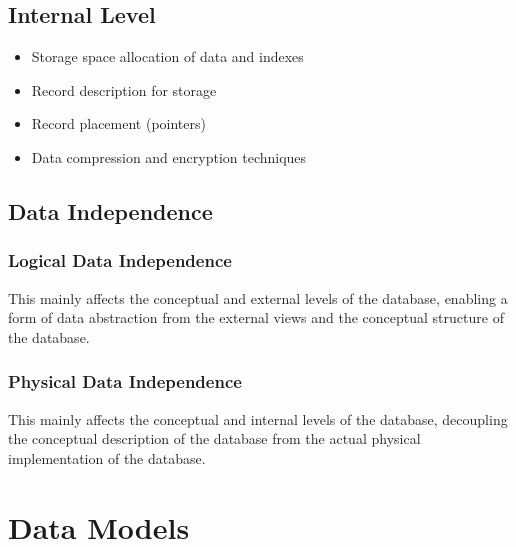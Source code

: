 \documentclass[12pt letter]{report}
\begin{document}
\subsection{Internal Level}


\begin{itemize}
  \item Storage space allocation of data and indexes
  \item Record description for storage
  \item Record placement (pointers)
  \item Data compression and encryption techniques
\end{itemize}

\subsection{Data Independence}
\subsubsection{Logical Data Independence}

This mainly affects the conceptual and external levels of the database, enabling a form of data abstraction from the
external views and the conceptual structure of the database.

\subsubsection{Physical Data Independence}

This mainly affects the conceptual and internal levels of the database, decoupling the conceptual description of the
database from the actual physical implementation of the database.

\section{Data Models}
\end{document}
